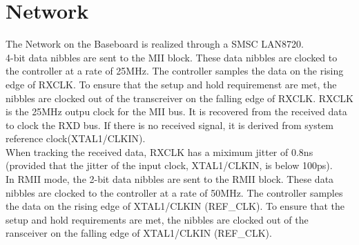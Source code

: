 \chapter{Network}
The Network on the Baseboard is realized through a SMSC LAN8720.\\
4-bit data nibbles are sent to the MII block. These data nibbles are clocked
to the controller at a rate of 25MHz. The controller samples the data on the
rising edge of RXCLK. To ensure that the setup and hold requiremenst are met,
the nibbles are clocked out of the transcreiver on the falling edge of RXCLK.
RXCLK is the 25MHz outpu clock for the MII bus. It is recovered from the received
data to clock the RXD bus. If there is no received signal, it is derived from
system reference clock(XTAL1/CLKIN).\\
When tracking the received data, RXCLK has a miximum jitter of 0.8ns (provided
that the jitter of the input clock, XTAL1/CLKIN, is below 100ps).\\
In RMII mode, the 2-bit data nibbles are sent to the RMII block. These data nibbles
are clocked to the controller at a rate of 50MHz. The controller samples the data
on the rising edge of XTAL1/CLKIN (REF\_CLK). To ensure that the setup and hold
requirements are met, the nibbles are clocked out of the ransceiver on the falling
edge of XTAL1/CLKIN (REF\_CLK).\\

